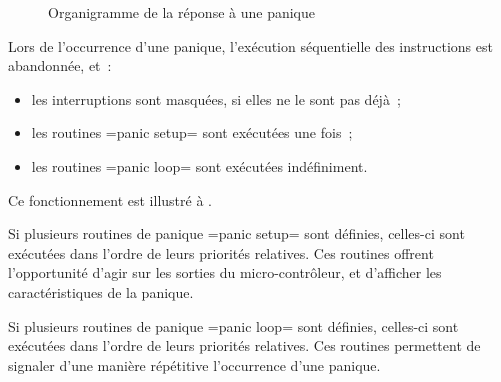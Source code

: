 \begin{figure}[t]
  \centering
  \small
  \caption{Organigramme de la réponse à une panique}
  \ligne
\end{figure}

Lors de l'occurrence d'une panique, l'exécution séquentielle des instructions est abandonnée, et~:
\begin{itemize}
  \item les interruptions sont masquées, si elles ne le sont pas déjà~;
  \item les routines \omnibus=panic setup= sont exécutées une fois~;
  \item les routines \omnibus=panic loop= sont exécutées indéfiniment.
\end{itemize}
Ce fonctionnement est illustré à .

Si plusieurs routines de panique \omnibus=panic setup= sont définies, celles-ci sont exécutées dans l'ordre de leurs priorités relatives. Ces routines offrent l'opportunité d'agir sur les sorties du micro-contrôleur, et d'afficher les caractéristiques de la panique.

Si plusieurs routines de panique \omnibus=panic loop= sont définies, celles-ci sont exécutées dans l'ordre de leurs priorités relatives. Ces routines permettent de signaler d'une manière répétitive l'occurrence d'une panique.


